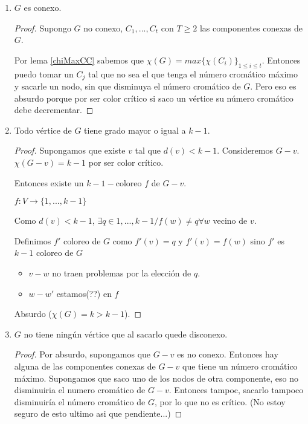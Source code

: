 \begin{enumerate}[label=\alph*)]
	\item {
		$G$ es conexo.

		\begin{proof}
			Supongo $G$ no conexo, $C_1, ..., C_t$ con $T \geq 2$ las componentes conexas de $G$. 

			Por lema \ref{chiMaxCC} sabemos que $\chi(G) = max \{\chi(C_i)\}_{1 \leq i \leq t}$. Entonces puedo tomar un $C_j$ tal que no sea el que tenga el número cromático máximo y sacarle un nodo, sin que disminuya el número cromático de $G$. Pero eso es absurdo porque por ser color crítico si saco un vértice su número cromático debe decrementar.
		\end{proof}
	}
	\item{
		Todo vértice de $G$ tiene grado mayor o igual a $k - 1$.

		\begin{proof}
			Supongamos que existe $v$ tal que $d(v) < k - 1$. Consideremos $G - v$. $\chi(G - v) = k - 1$ por ser color crítico.

			Entonces existe un $k-1-$coloreo $f$ de $G - v$.

			$f: V \longrightarrow \{1, ..., k - 1\}$

			Como $d(v) < k - 1$, $\exists q \in {1, ..., k - 1} / f(w) \not= q \forall w$ vecino de $v$.

			Definimos $f'$ coloreo de $G$ como $f'(v) = q$ y $f'(v) = f(w)$ sino $f'$ es $k - 1$ coloreo de $G$

			\begin{itemize}
				\item $v-w$ no traen problemas por la elección de $q$.
				\item $w-w'$ estamos(??) en $f$
			\end{itemize}

			Absurdo ($\chi(G) = k > k - 1$).
		\end{proof}
	}
	\item{
		$G$ no tiene ningún vértice que al sacarlo quede disconexo.

		\begin{proof}
			Por absurdo, supongamos que $G - v$ es no conexo. Entonces hay alguna de las componentes conexas de $G - v$ que tiene un número cromático máximo. Supongamos que saco uno de los nodos de otra componente, eso no disminuiria el numero cromático de $G - v$. Entonces tampoc, sacarlo tampoco disminuiría el número cromático de $G$, por lo que no es crítico. (No estoy seguro de esto ultimo asi que pendiente...)
		\end{proof}
	}
\end{enumerate}

